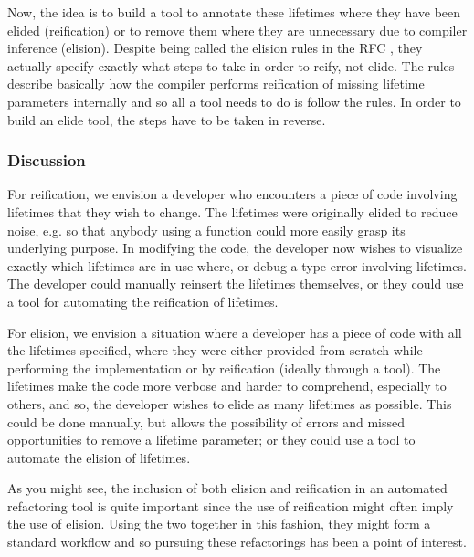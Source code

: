 Now, the idea is to build a tool to annotate these lifetimes where they have been elided (reification) or to remove them where they are unnecessary due to compiler inference (elision). Despite being called the elision rules in the RFC \cite{elisionrules}, they actually specify exactly what steps to take in order to reify, not elide. The rules describe basically how the compiler performs reification of missing lifetime parameters internally and so all a tool needs to do is follow the rules. In order to build an elide tool, the steps have to be taken in reverse.


\subsubsection{Discussion}

For reification, we envision a developer who encounters a piece of code involving lifetimes that they wish to change. The lifetimes were originally elided to reduce noise, e.g. so that anybody using a function could more easily grasp its underlying purpose. In modifying the code, the developer now wishes to visualize exactly which lifetimes are in use where, or debug a type error involving lifetimes. The developer could manually reinsert the lifetimes themselves, or they could use a tool for automating the reification of lifetimes.

For elision, we envision a situation where a developer has a piece of code with all the lifetimes specified, where they were either provided from scratch while performing the implementation or by reification (ideally through a tool). The lifetimes make the code more verbose and harder to comprehend, especially to others, and so, the developer wishes to elide as many lifetimes as possible. This could be done manually, but allows the possibility of errors and missed opportunities to remove a lifetime parameter; or they could use a tool to automate the elision of lifetimes. 

As you might see, the inclusion of both elision and reification in an automated refactoring tool is quite important since the use of reification might often imply the use of elision. Using the two together in this fashion, they might form a standard workflow and so pursuing these refactorings has been a point of interest.